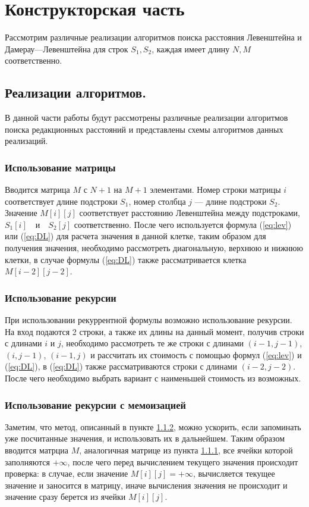 \chapter{Конструкторская часть}

Рассмотрим различные реализации алгоритмов поиска расстояния Левенштейна и Дамерау---Левенштейна для строк $S_{1},S_{2}$, каждая имеет
длину $N , M$ соответственно.


\section{Реализации алгоритмов.}
В данной части работы будут рассмотрены различные реализации
алгоритмов поиска редакционных расстояний и представлены схемы алгоритмов данных реализаций.

\subsection{Использование матрицы}
\label{subsec:matrix_math_desc}
Вводится матрица $M$ с $N + 1$ на $M + 1$ элементами. Номер строки матрицы $i$ соответствует длине подстроки $S_{1}$, номер столбца $j$ --- длине подстроки $S_{2}$.
Значение $M[i][j]$ соответствует расстоянию Левенштейна между подстроками, $S_{1}[i] \quad \text{и} \quad S_{2}[j]$ соответственно. После чего используется формула (\ref{eq:lev}) или
(\ref{eq:DL}) для расчета значения в данной клетке, таким образом для получения значения, необходимо рассмотреть диагональную, верхнюю и нижнюю клетки, в случае формулы (\ref{eq:DL}) также рассматривается клетка $M[i-2][j-2]$.


\subsection{Использование рекурсии}
\label{subsec:recurse_math_desc}
При использовании рекуррентной формулы возможно использование рекурсии.
На вход подаются 2 строки, а также их длины на данный момент, получив строки с длинами $i$ и $j$, необходимо рассмотреть 
те же строки с длинами $(i-1,j-1)$, $(i,j-1)$, $(i-1,j)$ и рассчитать их стоимость  с помощью формул (\ref{eq:lev}) и (\ref{eq:DL}), в (\ref{eq:DL}) также рассматриваются строки с длинами $(i-2,j-2)$. 
После чего необходимо выбрать вариант с наименьшей стоимость из возможных.

\subsection{Использование рекурсии с мемоизацией}
\label{subec:memorysation_descr}
Заметим, что метод, описанный в пункте \ref{subsec:recurse_math_desc}, можно ускорить, если запоминать уже посчитанные значения, и использовать их в дальнейшем.
Таким образом вводится матрциа $M$, аналогичная матрице из пункта \ref{subsec:matrix_math_desc}, все ячейки которой заполняются $+\infty$, после чего
перед вычислением текущего значения происходит проверка: в случае, если значение $M[i][j] = +\infty$, вычисляется текущее значение и заносится в матрицу, иначе
вычисления значения не происходит и значение сразу берется из ячейки $M[i][j]$.

